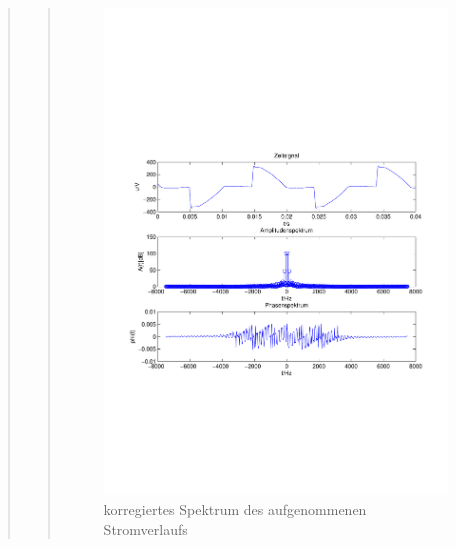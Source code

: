 \begin{quote}
\begin{quote}
        \begin{figure}[H]
        \centering
            \includegraphics[scale=0.7, trim = 1.5cm 7cm 1.5cm 8.5cm, clip]{./Bilder/korrigiertesSpektrumauf33}
                \caption{korregiertes Spektrum des aufgenommenen Stromverlaufs}
        \end{figure}


\end{quote}
\end{quote}
